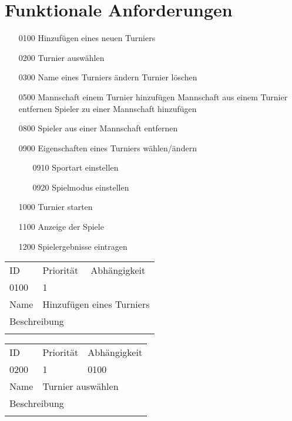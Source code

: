 \section{Funktionale Anforderungen}
	\begin{itemize}
		\item[0100] Hinzufügen eines neuen Turniers
		\item[0200] Turnier auswählen
		\item[0300] Name eines Turniers ändern
		\itme[0400] Turnier löschen
		\item[0500] Mannschaft einem Turnier hinzufügen
		\itme[0600] Mannschaft aus einem Turnier entfernen
		\itme[0700] Spieler zu einer Mannschaft hinzufügen
		\item[0800] Spieler aus einer Mannschaft entfernen
		\item[0900] Eigenschaften eines Turniers wählen/ändern
		\begin{itemize}
			\item[0910] Sportart einstellen
			\item[0920] Spielmodus einstellen
		\end{itemize}
		\item[1000] Turnier starten
		\item[1100] Anzeige der Spiele
		\item[1200] Spielergebnisse eintragen
	\end{itemize}
	
	\begin{tabularx}{\textwidth}{|l|l|l|}
		ID & Priorität & Abhängigkeit \\
		0100 & 1 & \\
		\hline
		Name & \multicolumn{2}{l}{Hinzufügen eines Turniers} \\
		\multicolumn{3}{l}{Beschreibung}\\
		\multicolumn{3}{l}{}\\
		\hline		 
	\end{tabularx}
	
	\begin{tabularx}{\textwidth}{|l|l|l|}
		ID & Priorität & Abhängigkeit \\
		0200 & 1 & 0100\\
		\hline
		Name & \multicolumn{2}{l}{Turnier auswählen} \\
		\multicolumn{3}{l}{Beschreibung}\\
		\multicolumn{3}{l}{}\\
		\hline		 
	\end{tabularx}
	
